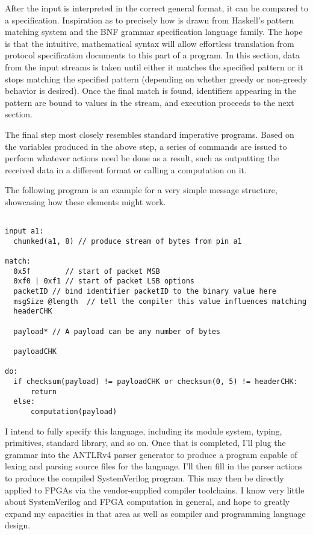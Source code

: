 \documentclass[12pt, arial, letterpaper]{article}
\begin{document}
After the input is interpreted in the correct general format, it can be compared to a specification. Inspiration as to precisely how is drawn from Haskell's pattern matching system \cite{Marlow_haskell2010} and the BNF grammar specification  language family\cite{bnf}. The hope is that the intuitive, mathematical syntax will allow effortless translation from protocol specification documents to this part of a program. In this section, data from the input streams is taken until either it matches the specified pattern or it stops matching the specified pattern (depending on whether greedy or non-greedy behavior is desired). Once the final match is found, identifiers appearing in the pattern are bound to values in the stream, and execution proceeds to the next section.
\newline

The final step most closely resembles standard imperative programs. Based on the variables produced in the above step, a series of commands are issued to perform whatever actions need be done as a result, such as outputting the received data in a different format or calling a computation on it.
\newline

The following program is an example for a very simple message structure, showcasing how these elements might work.
\begin{verbatim}

input a1:
  chunked(a1, 8) // produce stream of bytes from pin a1

match:
  0x5f        // start of packet MSB
  0xf0 | 0xf1 // start of packet LSB options
  packetID // bind identifier packetID to the binary value here
  msgSize @length  // tell the compiler this value influences matching
  headerCHK

  payload* // A payload can be any number of bytes

  payloadCHK

do:
  if checksum(payload) != payloadCHK or checksum(0, 5) != headerCHK:
      return
  else:
      computation(payload)

\end{verbatim}


I intend to fully specify this language, including its module system, typing, primitives, standard library, and so on. Once that is completed, I'll plug the grammar into the ANTLRv4 parser generator \cite{antlr} to produce a program capable of lexing and parsing source files for the language. I'll then fill in the parser actions to produce the compiled SystemVerilog program. This may then be directly applied to FPGAs via the vendor-supplied compiler toolchains.
I know very little about SystemVerilog and FPGA computation in general, and hope to greatly expand my capacities in that area as well as compiler and programming language design.
\newline
\end{document}
